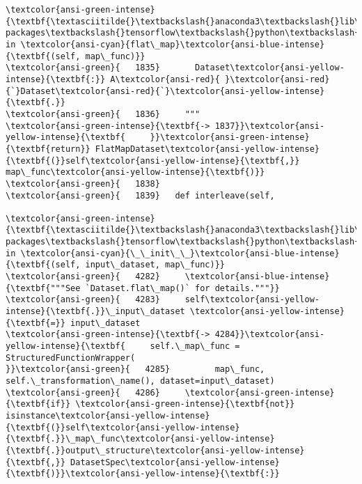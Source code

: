 \documentclass[11pt]{article}
\begin{document}
\begin{Verbatim}[commandchars=\\\{\}, frame=single, framerule=2mm, rulecolor=\color{outerrorbackground}]
\textcolor{ansi-green-intense}{\textbf{\textasciitilde{}\textbackslash{}anaconda3\textbackslash{}lib\textbackslash{}site-packages\textbackslash{}tensorflow\textbackslash{}python\textbackslash{}data\textbackslash{}ops\textbackslash{}dataset\_ops.py}} in \textcolor{ansi-cyan}{flat\_map}\textcolor{ansi-blue-intense}{\textbf{(self, map\_func)}}
\textcolor{ansi-green}{   1835}       Dataset\textcolor{ansi-yellow-intense}{\textbf{:}} A\textcolor{ansi-red}{ }\textcolor{ansi-red}{`}Dataset\textcolor{ansi-red}{`}\textcolor{ansi-yellow-intense}{\textbf{.}}
\textcolor{ansi-green}{   1836}     """
\textcolor{ansi-green-intense}{\textbf{-> 1837}}\textcolor{ansi-yellow-intense}{\textbf{     }}\textcolor{ansi-green-intense}{\textbf{return}} FlatMapDataset\textcolor{ansi-yellow-intense}{\textbf{(}}self\textcolor{ansi-yellow-intense}{\textbf{,}} map\_func\textcolor{ansi-yellow-intense}{\textbf{)}}
\textcolor{ansi-green}{   1838} 
\textcolor{ansi-green}{   1839}   def interleave(self,

\textcolor{ansi-green-intense}{\textbf{\textasciitilde{}\textbackslash{}anaconda3\textbackslash{}lib\textbackslash{}site-packages\textbackslash{}tensorflow\textbackslash{}python\textbackslash{}data\textbackslash{}ops\textbackslash{}dataset\_ops.py}} in \textcolor{ansi-cyan}{\_\_init\_\_}\textcolor{ansi-blue-intense}{\textbf{(self, input\_dataset, map\_func)}}
\textcolor{ansi-green}{   4282}     \textcolor{ansi-blue-intense}{\textbf{"""See `Dataset.flat\_map()` for details."""}}
\textcolor{ansi-green}{   4283}     self\textcolor{ansi-yellow-intense}{\textbf{.}}\_input\_dataset \textcolor{ansi-yellow-intense}{\textbf{=}} input\_dataset
\textcolor{ansi-green-intense}{\textbf{-> 4284}}\textcolor{ansi-yellow-intense}{\textbf{     self.\_map\_func = StructuredFunctionWrapper(
}}\textcolor{ansi-green}{   4285}         map\_func, self.\_transformation\_name(), dataset=input\_dataset)
\textcolor{ansi-green}{   4286}     \textcolor{ansi-green-intense}{\textbf{if}} \textcolor{ansi-green-intense}{\textbf{not}} isinstance\textcolor{ansi-yellow-intense}{\textbf{(}}self\textcolor{ansi-yellow-intense}{\textbf{.}}\_map\_func\textcolor{ansi-yellow-intense}{\textbf{.}}output\_structure\textcolor{ansi-yellow-intense}{\textbf{,}} DatasetSpec\textcolor{ansi-yellow-intense}{\textbf{)}}\textcolor{ansi-yellow-intense}{\textbf{:}}


\end{Verbatim}
\end{document}
